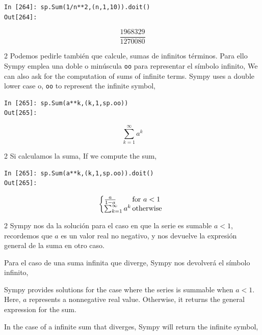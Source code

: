 \begin{center}
	\begin{minipage}{.5\textwidth}
		\begin{verbatim}
In [264]: sp.Sum(1/n**2,(n,1,10)).doit()
Out[264]: 	
		\end{verbatim}
		\begin{equation*}
			\frac{1968329}{1270080}
		\end{equation*}
	\end{minipage}
\end{center}
\begin{paracol}{2}
Podemos pedirle también que calcule, sumas de infinitos términos. Para ello Sympy emplea una doble o minúscula \texttt{oo} para representar el símbolo infinito,
\switchcolumn
We can also ask for the computation of sums of infinite terms. Sympy uses a double lower case o, \texttt{oo} to represent the infinite symbol,
\end{paracol}
\begin{center}
	\begin{minipage}{.8\textwidth}
		\begin{verbatim}
In [265]: sp.Sum(a**k,(k,1,sp.oo))
Out[265]: 	
		\end{verbatim}
		\begin{equation*}
		\sum_{k=1}^{\infty}a^k	
		\end{equation*}
	\end{minipage}
\end{center}
\begin{paracol}{2}
Si calculamos la suma,
\switchcolumn
If we compute the sum,
\end{paracol}
\begin{center}
	\begin{minipage}{.6\textwidth}
		\begin{verbatim}
In [265]: sp.Sum(a**k,(k,1,sp.oo)).doit()
Out[265]: 	
		\end{verbatim}
		\begin{equation*}
		\left\{
		\begin{array}{@{}l@{\,}l}
			\frac{a}{1-a} & \text{for}\ a<1 \\
			\sum_{k=1}^{\infty} a^k & \text{otherwise}
		\end{array}
		\right.
	\end{equation*}
	\end{minipage}
\end{center}

\begin{paracol}{2}
Sympy nos da la solución para el caso en que la serie es sumable $a<1$, recordemos que $a$ es un valor real no negativo, y nos devuelve la expresión general de la suma en otro caso.

Para el caso de una suma infinita que diverge, Sympy nos devolverá el símbolo infinito,

\switchcolumn
Sympy provides solutions for the case where the series is summable when \( a < 1 \). Here, \( a \) represents a nonnegative real value. Otherwise, it returns the general expression for the sum.

In the case of a infinite sum that diverges, Sympy will return the infinite symbol,
\end{paracol}

